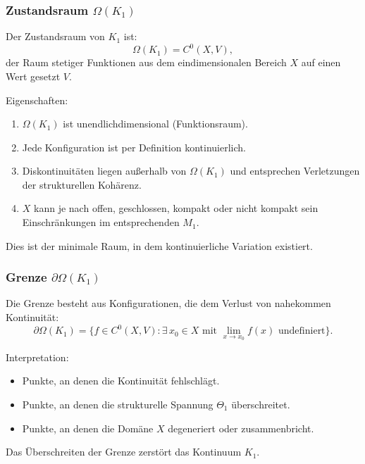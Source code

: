 \subsubsection{Zustandsraum \texorpdfstring{$\Omega(K_1)$}{\Omega(K_1)}}

Der Zustandsraum von $K_1$ ist:
\[
\Omega(K_1) = C^0(X, V),
\]
der Raum stetiger Funktionen aus dem eindimensionalen Bereich $X$
auf einen Wert gesetzt $V$.

Eigenschaften:
\begin{enumerate}
    \item $\Omega(K_1)$ ist unendlichdimensional (Funktionsraum).
    \item Jede Konfiguration ist per Definition kontinuierlich.
    \item Diskontinuitäten liegen außerhalb von $\Omega(K_1)$ und entsprechen
          Verletzungen der strukturellen Kohärenz.
    \item $X$ kann je nach offen, geschlossen, kompakt oder nicht kompakt sein
          Einschränkungen im entsprechenden $M_1$.
\end{enumerate}

Dies ist der minimale Raum, in dem kontinuierliche Variation existiert.

\subsubsection{Grenze \texorpdfstring{$\partial\Omega(K_1)$}{\partial\Omega(K_1)}}

Die Grenze besteht aus Konfigurationen, die dem Verlust von nahekommen
Kontinuität:
\[
\partial\Omega(K_1) =
\{ f \in C^0(X,V) : \exists\, x_0 \in X \text{ mit }
\lim_{x \to x_0} f(x) \text{ undefiniert} \}.
\]

Interpretation:
\begin{itemize}
    \item Punkte, an denen die Kontinuität fehlschlägt.
    \item Punkte, an denen die strukturelle Spannung $\Theta_1$ überschreitet.
    \item Punkte, an denen die Domäne $X$ degeneriert oder zusammenbricht.
\end{itemize}

Das Überschreiten der Grenze zerstört das Kontinuum $K_1$.

